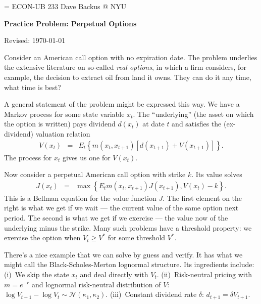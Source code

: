 \documentclass[11pt]{exam}
\begin{document}
\parskip=\bigskipamount
\parindent=0.0in
\thispagestyle{empty}
{\large ECON-UB 233 \hfill Dave Backus @ NYU}

\bigskip\bigskip
\centerline{\Large \bf Practice Problem:  Perpetual Options}
\centerline{Revised: \today}

\bigskip

Consider an American call option with no expiration date.
The problem underlies the extensive literature on so-called {\it real options\/}, 
in which a firm considers, for example, the decision to extract oil 
from land it owns.  
They can do it any time, what time is best?  

A general statement of the problem might be expressed this way.  
We have a Markov process for some state variable $x_t$.
The ``underlying'' (the asset on which the option is written)
pays dividend $d(x_t)$ at date $t$ and
satisfies the (ex-dividend) valuation relation
\begin{eqnarray}
    V(x_t) &=&  E_t \left\{ m(x_t,x_{t+1}) \left[ d(x_{t+1}) + V(x_{t+1}) \right]
                \right\} .
    \label{eq:perpetual-underlying}
\end{eqnarray}
The process for $x_t$ gives us one for $V(x_t)$. 

Now consider a perpetual American call option with strike $k$.
Its value solves
\begin{eqnarray}
    J(x_t) &=& \max \left\{
            E_t m(x_t,x_{t+1}) J(x_{t+1}) ,
            V(x_t) - k
            \right\} .
        \label{eq:perpetual-option}
\end{eqnarray}
This is a Bellman equation for the value function $J$.
The first element on the right is what we get if we wait ---
the current value of the same option next period.
The second is what we get if we exercise ---
the value now of the underlying minus the strike.
Many such problems have a threshold property:
we exercise the option when $V_t \geq V^*$ for some threshold $V^*$.

There's a nice example that we can solve by guess and verify. 
It has what we might call the Black-Scholes-Merton lognormal structure.  
Its ingredients include:  
(i)~We skip the state $x_t$ and deal directly with $V_t$.
(ii)~Risk-neutral pricing with $m = e^{-r}$ and lognormal risk-neutral distribution 
of $V$:  
$\log V_{t+1} - \log V_t \sim \mathcal{N}(\kappa_1,\kappa_2)$.
(iii)~Constant dividend rate $\delta$:  $d_{t+1} = \delta V_{t+1}$.  
\end{document}
